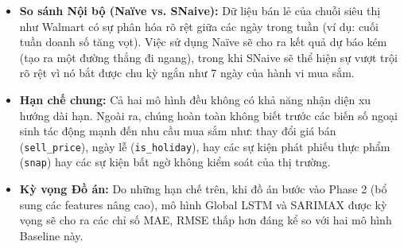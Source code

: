 \documentclass[12pt,a4paper]{article}
\begin{document}
    \begin{itemize}
        \item \textbf{So sánh Nội bộ (Naïve vs. SNaive):} Dữ liệu bán lẻ của chuỗi siêu thị như Walmart có sự phân hóa rõ rệt giữa các ngày trong tuần (ví dụ: cuối tuần doanh số tăng vọt). Việc sử dụng Naïve sẽ cho ra kết quả dự báo kém (tạo ra một đường thẳng đi ngang), trong khi SNaive sẽ thể hiện sự vượt trội rõ rệt vì nó bắt được chu kỳ ngắn như 7 ngày của hành vi mua sắm.
        \item \textbf{Hạn chế chung:} Cả hai mô hình đều không có khả năng nhận diện xu hướng dài hạn. Ngoài ra, chúng hoàn toàn không biết trước các biến số ngoại sinh tác động mạnh đến nhu cầu mua sắm như: thay đổi giá bán (\texttt{sell\_price}), ngày lễ (\texttt{is\_holiday}), hay các sự kiện phát phiếu thực phẩm (\texttt{snap}) hay các sự kiện bất ngờ không kiểm soát của thị trường.
        \item \textbf{Kỳ vọng Đồ án:} Do những hạn chế trên, khi đồ án bước vào Phase 2 (bổ sung các features nâng cao), mô hình Global LSTM và SARIMAX được kỳ vọng sẽ cho ra các chỉ số MAE, RMSE thấp hơn đáng kể so với hai mô hình Baseline này.
    \end{itemize}
\end{document}
